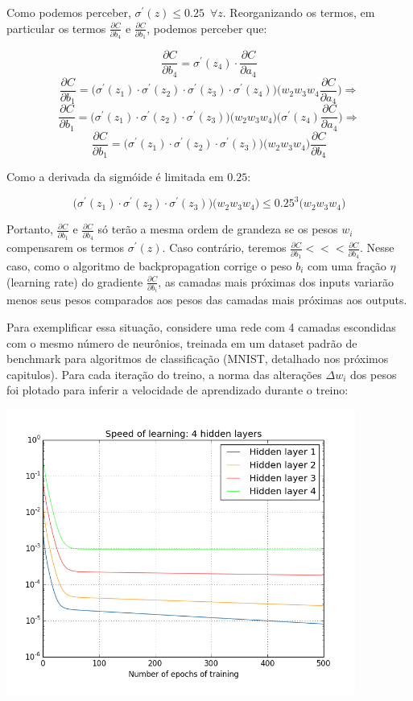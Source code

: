 \documentclass[
	12pt,				%
	oneside,			%
	a4paper,			%
	english,			%
	french,				%
	spanish,			%
	brazil,				%
	]{abntex2}
\begin{document}
Como podemos perceber, $\sigma^{'}(z) \leq 0.25 \enspace \forall z$. Reorganizando os termos, em particular os termos $\frac{\partial C}{\partial b_4}$ e $\frac{\partial C}{\partial b_1}$, podemos perceber que:

$$ \frac{\partial C}{\partial b_4} =  \sigma^{'}(z_4)\cdot\frac{\partial C}{\partial a_4} $$
$$\frac{\partial C}{\partial b_1} =\bigg( \sigma^{'}(z_1) \cdot \sigma^{'}(z_2) \cdot \sigma^{'}(z_3) \cdot \sigma^{'}(z_4) \bigg)\bigg( w_2 w_3 w_4 \frac{\partial C}{\partial a_4}\bigg) \Rightarrow $$
$$ \frac{\partial C}{\partial b_1} = \bigg( \sigma^{'}(z_1) \cdot \sigma^{'}(z_2) \cdot \sigma^{'}(z_3) \bigg)\bigg( w_2 w_3 w_4\bigg) \bigg( \sigma^{'}(z_4) \frac{\partial C}{\partial a_4} \bigg) \Rightarrow $$
$$  \frac{\partial C}{\partial b_1} = \bigg( \sigma^{'}(z_1) \cdot \sigma^{'}(z_2) \cdot \sigma^{'}(z_3) \bigg)\bigg( w_2 w_3 w_4\bigg) \frac{\partial C}{\partial b_4} $$

Como a derivada da sigmóide é limitada em $0.25$:

$$\bigg( \sigma^{'}(z_1) \cdot \sigma^{'}(z_2) \cdot \sigma^{'}(z_3) \bigg)\bigg( w_2 w_3 w_4\bigg) \leq 0.25^3 \bigg( w_2 w_3 w_4\bigg) $$

Portanto, $\frac{\partial C}{\partial b_1}$ e $\frac{\partial C}{\partial b_4}$ só terão a mesma ordem de grandeza se os pesos $w_i$ compensarem os termos $\sigma^{'}(z)$. Caso contrário, teremos $\frac{\partial C}{\partial b_1} <<< \frac{\partial C}{\partial b_4}$. Nesse caso, como o algoritmo de backpropagation corrige o peso $b_i$ com uma fração $\eta$ (learning rate) do gradiente $\frac{\partial C}{\partial b_i}$, as camadas mais próximas dos inputs variarão menos seus pesos comparados aos pesos das camadas mais próximas aos outputs.

Para exemplificar essa situação, considere uma rede com 4 camadas escondidas com o mesmo número de neurônios, treinada em um dataset padrão de benchmark para algoritmos de classificação (MNIST, detalhado nos próximos capitulos). Para cada iteração do treino, a norma das alterações $\Delta w_i$ dos pesos foi plotado para inferir a velocidade de aprendizado durante o treino:

\begin{center}
	\includegraphics[scale=0.8]{vanishinggradient.png}
\end{center}
\end{document}
